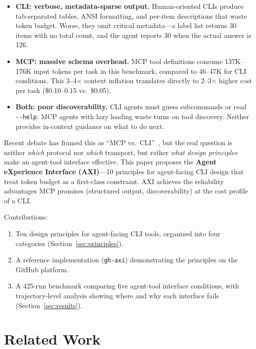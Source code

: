\documentclass{article}
\begin{document}
\begin{itemize}
  \item \textbf{CLI: verbose, metadata-sparse output.} Human-oriented CLIs
    produce tab-separated tables, ANSI formatting, and per-item descriptions
    that waste token budget. Worse, they omit critical metadata---a label list
    returns 30 items with no total count, and the agent reports 30 when the
    actual answer is 126.
  \item \textbf{MCP: massive schema overhead.} MCP tool definitions consume
    137K--176K input tokens per task in this benchmark, compared to 46--47K for
    CLI conditions. This 3--4$\times$ context inflation translates directly to
    2--3$\times$ higher cost per task (\$0.10--0.15 vs.\ \$0.05).
  \item \textbf{Both: poor discoverability.} CLI agents must guess subcommands
    or read \texttt{-{}-help}. MCP agents with lazy loading waste turns on
    tool discovery. Neither provides in-context guidance on what to do next.
\end{itemize}

Recent debate has framed this as ``MCP vs.\ CLI''~\cite{smithery2026}, but
the real question is neither \emph{which} protocol nor \emph{which} transport,
but rather \emph{what design principles} make an agent-tool interface
effective. This paper proposes the \textbf{Agent eXperience Interface (AXI)}---10
principles for agent-facing CLI design that treat token budget as a
first-class constraint. AXI achieves the reliability advantages MCP promises
(structured output, discoverability) at the cost profile of a CLI.

Contributions:
\begin{enumerate}
  \item Ten design principles for agent-facing CLI tools, organized into four
    categories (Section~\ref{sec:principles}).
  \item A reference implementation (\texttt{gh-axi}) demonstrating the
    principles on the GitHub platform.
  \item A 425-run benchmark comparing five agent-tool interface conditions,
    with trajectory-level analysis showing where and why each interface
    fails (Section~\ref{sec:results}).
\end{enumerate}

\section{Related Work}
\label{sec:related}
\end{document}
